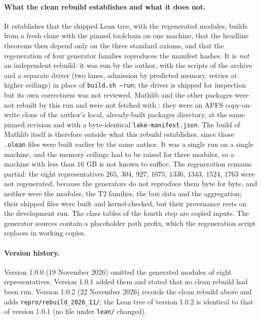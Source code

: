 \documentclass[11pt]{article}
\theoremstyle{remark}
\begin{document}
\paragraph{What the clean rebuild establishes and what it does not.} It establishes that the shipped Lean tree, with the regenerated modules, builds from a fresh clone with the pinned toolchain on one machine, that the headline theorems then depend only on the three standard axioms, and that the regeneration of four generator families reproduces the manifest hashes. It is \emph{not} an independent rebuild: it was run by the author, with the scripts of the archive and a separate driver (two lanes, admission by predicted memory, retries at higher ceilings) in place of \texttt{build.sh --run}; the driver is shipped for inspection but its own correctness was not reviewed. Mathlib and the other packages were not rebuilt by this run and were not fetched with : they were an APFS copy-on-write clone of the author's local, already-built packages directory, at the same pinned revision and with a byte-identical \texttt{lake-manifest.json}. The build of Mathlib itself is therefore outside what this rebuild establishes, since those \texttt{.olean} files were built earlier by the same author. It was a single run on a single machine, and the memory ceilings had to be raised for three modules, so a machine with less than $16$ GB is not known to suffice. The regeneration remains partial: the eight representatives $265$, $304$, $927$, $1075$, $1336$, $1343$, $1524$, $1763$ were not regenerated, because the generators do not reproduce them byte for byte, and neither were the  modules, the T2 families, the box data and the aggregation; their shipped files were built and kernel-checked, but their provenance rests on the development run. The class tables of the fourth step are copied inputs. The generator sources contain a placeholder path prefix, which the regeneration script replaces in working copies.

\paragraph{Version history.} Version 1.0.0 (19 November 2026) omitted the generated modules of eight representatives. Version 1.0.1 added them and stated that no clean rebuild had been run. Version 1.0.2 (22 November 2026) records the clean rebuild above and adds \texttt{repro/rebuild\_2026\_11/}; the Lean tree of version 1.0.2 is identical to that of version 1.0.1 (no file under \texttt{lean/} changed).
\end{document}
